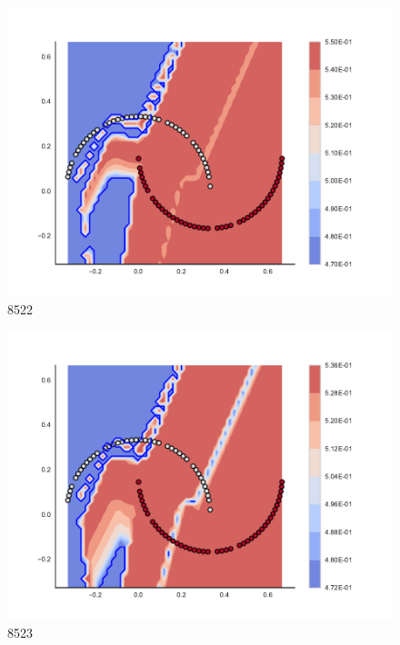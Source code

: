 \begin{subfigure}[b]{0.09\textwidth}
    \includegraphics[clip, trim=2.35cm 1.75cm 4.5cm 0cm,width=\textwidth]{img/convergence/8522.pdf}
    \caption{8522}
    \label{fig:convergence_8522}
\end{subfigure}
%
\begin{subfigure}[b]{0.09\textwidth}
    \includegraphics[clip, trim=2.35cm 1.75cm 4.5cm 0cm,width=\textwidth]{img/convergence/8523.pdf}
    \caption{8523}
    \label{fig:convergence_8523}
\end{subfigure}
%
